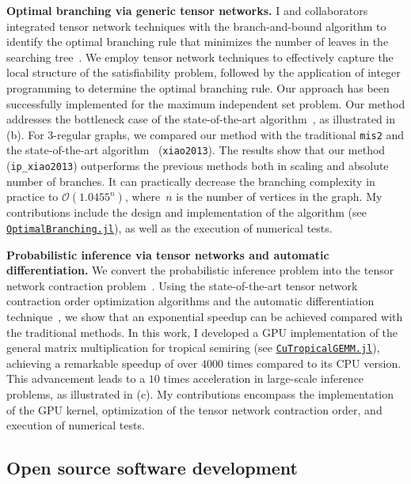 \textbf{Optimal branching via generic tensor networks.}
I and collaborators integrated tensor network techniques with the branch-and-bound algorithm to identify the optimal branching rule that minimizes the number of leaves in the searching tree~\cite{tensorbranching}. 
We employ tensor network techniques to effectively capture the local structure of the satisfiability problem, followed by the application of integer programming to determine the optimal branching rule. Our approach has been successfully implemented for the maximum independent set problem. 
Our method addresses the bottleneck case of the state-of-the-art algorithm~\cite{XIAO201392}, as illustrated in  (b).
For 3-regular graphs, we compared our method with the traditional \texttt{mis2} and the state-of-the-art algorithm~\cite{XIAO201392} (\texttt{xiao2013}).
The results show that our method (\texttt{ip\_xiao2013}) outperforms the previous methods both in scaling and absolute number of branches.
It can practically decrease the branching complexity in practice to $\mathcal{O}(1.0455^n)$, where~$n$ is the number of vertices in the graph.
My contributions include the design and implementation of the algorithm (see \href{https://github.com/ArrogantGao/OptimalBranching.jl}{\texttt{OptimalBranching.jl}}), as well as the execution of numerical tests.


\textbf{Probabilistic inference via tensor networks and automatic differentiation.}
We convert the probabilistic inference problem into the tensor network contraction problem~\cite{roa2024probabilistic}.
Using the state-of-the-art tensor network contraction order optimization algorithms and the automatic differentiation technique~\cite{LIAO2019}, we show that an exponential speedup can be achieved compared with the traditional methods.
In this work, I developed a GPU implementation of the general matrix multiplication for tropical semiring (see \href{https://github.com/TensorBFS/CuTropicalGEMM.jl}{\texttt{CuTropicalGEMM.jl}}), achieving a remarkable speedup of over $4000$ times compared to its CPU version. 
This advancement leads to a $10$ times acceleration in large-scale inference problems, as illustrated in  (c). 
My contributions encompass the implementation of the GPU kernel, optimization of the tensor network contraction order, and execution of numerical tests.

\subsection{Open source software development}

